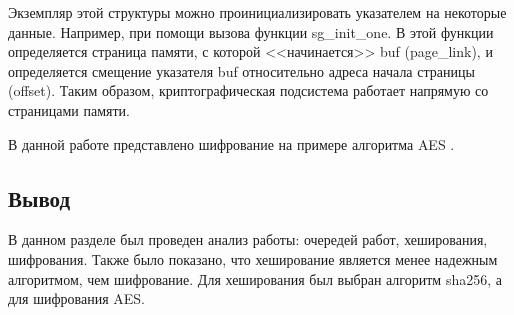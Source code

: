 Экземпляр этой структуры можно проинициализировать указателем на некоторые данные. Например, при помощи вызова функции sg\_init\_one.
В этой функции определяется страница памяти, с которой <<начинается>> buf (page\_link), и определяется смещение указателя buf относительно адреса начала страницы (offset).
Таким образом, криптографическая подсистема работает напрямую со страницами памяти.

В данной работе представлено шифрование на примере алгоритма AES \cite{aes}.

\clearpage

\subsection*{Вывод}

В данном разделе был проведен анализ работы: очередей работ, хеширования, шифрования.
Также было показано, что хеширование является менее надежным алгоритмом, чем шифрование.
Для хеширования был выбран алгоритм sha256, а для шифрования AES.

